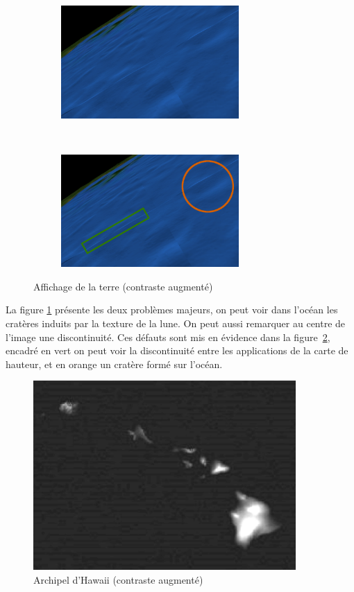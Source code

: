 \begin{figure}[H]
    \centering
    \begin{subfigure}[b]{0.45\textwidth}
       \centering \includegraphics[width=\textwidth,height=4.3cm]{img/earth2.png}
       \caption{}\label{fig:earth}
    \end{subfigure}
    ~ 
    \begin{subfigure}[b]{0.45\textwidth}
       \centering \includegraphics[width=\textwidth,height=4.3cm]{img/earth2_eli5.png}
       \caption{}\label{fig:earth_eli5}
    \end{subfigure}
    \caption{Affichage de la terre (contraste augmenté)}\label{fig:earthcontraste}
\end{figure}

    
    La figure \ref{fig:earth} présente les deux problèmes majeurs, on peut voir dans l'océan les cratères induits par la texture de la lune. On peut aussi remarquer au centre de l'image une discontinuité. Ces défauts sont mis en évidence dans la figure~\ref{fig:earth_eli5}, encadré en vert on peut voir la discontinuité entre les applications de la carte de hauteur, et en orange un cratère formé sur l'océan.\\
    
    
    
        \begin{figure}
        \centering
        \includegraphics[width=10cm]{img/hawaii2.png}
        \caption{Archipel d'Hawaii (contraste augmenté)}
        \label{fig:hawaii}
    \end{figure}
    
